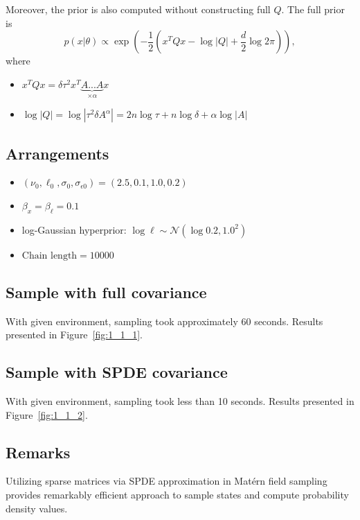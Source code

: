 \documentclass[times, a4paper, 12pt, onecolumn, oneside]{article}
\begin{document}
Moreover, the prior is also computed without constructing full $Q$. The full prior is
\[
p(x | \theta) \propto \exp\left(-\frac{1}{2}\left( x^TQx - \log |Q| + \frac{d}{2}\log2\pi \right) \right),
\]
where
\begin{itemize}
\item $x^T Qx = \delta\tau^2 x^T\underbrace{A...A}_{\times \alpha} x$
\item $\log |Q| = \log |\tau^2 \delta A^\alpha| = 2n\log\tau + n\log\delta + \alpha\log|A|$
\end{itemize}

\subsection{Arrangements}

\begin{itemize}
\item $(\nu_0, \ell_0, \sigma_0, \sigma_{\epsilon0}) = (2.5, 0.1, 1.0, 0.2)$
\item $\beta_x = \beta_\ell = 0.1$
\item log-Gaussian hyperprior: $\log\ell \sim \mathcal{N}(\log 0.2, 1.0^2)$
\item $\text{Chain length} = 10000$
\end{itemize}

\subsection{Sample with full covariance}

With given environment, sampling took approximately 60 seconds.
Results presented in Figure~\ref{fig:1_1_1}.

\subsection{Sample with SPDE covariance}

With given environment, sampling took less than 10 seconds.
Results presented in Figure~\ref{fig:1_1_2}.



\subsection{Remarks}

Utilizing sparse matrices via SPDE approximation in Matérn field sampling provides remarkably efficient approach to sample states and compute probability density values.
\end{document}
